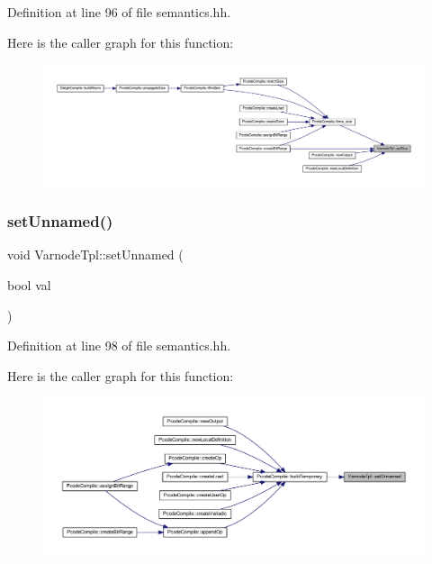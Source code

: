Definition at line 96 of file semantics.\+hh.

Here is the caller graph for this function\+:
\nopagebreak
\begin{figure}[H]
\begin{center}
\leavevmode
\includegraphics[width=350pt]{class_varnode_tpl_a83320b75a364cdc5c335df6bb5595b30_icgraph}
\end{center}
\end{figure}
\mbox{\label{class_varnode_tpl_a29e83b9bc3e299e73ec67f3ae3f76e70}} 
\subsubsection{\texorpdfstring{setUnnamed()}{setUnnamed()}}
{\footnotesize\ttfamily void Varnode\+Tpl\+::set\+Unnamed (\begin{DoxyParamCaption}\item[{bool}]{val }\end{DoxyParamCaption})\hspace{0.3cm}{\ttfamily [inline]}}



Definition at line 98 of file semantics.\+hh.

Here is the caller graph for this function\+:
\nopagebreak
\begin{figure}[H]
\begin{center}
\leavevmode
\includegraphics[width=350pt]{class_varnode_tpl_a29e83b9bc3e299e73ec67f3ae3f76e70_icgraph}
\end{center}
\end{figure}
\mbox{\label{class_varnode_tpl_a693d67734f6eb8c72419db6c7e977b6e}} 
